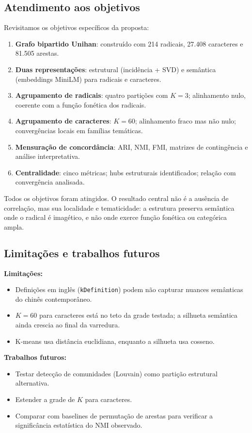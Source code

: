 \documentclass[10pt, a4paper, titlepage]{extarticle}
\begin{document}
\subsection{Atendimento aos objetivos}
Revisitamos os objetivos específicos da proposta:

\begin{enumerate}
    \item \textbf{Grafo bipartido Unihan}: construído com 214 radicais, 27.408 caracteres e 81.505 arestas.
    \item \textbf{Duas representações}: estrutural (incidência + SVD) e semântica (embeddings MiniLM) para radicais e caracteres.
    \item \textbf{Agrupamento de radicais}: quatro partições com $K = 3$; alinhamento nulo, coerente com a função fonética dos radicais.
    \item \textbf{Agrupamento de caracteres}: $K = 60$; alinhamento fraco mas não nulo; convergências locais em famílias temáticas.
    \item \textbf{Mensuração de concordância}: ARI, NMI, FMI,
    matrizes de contingência e análise interpretativa.
    \item \textbf{Centralidade}: cinco métricas; hubs estruturais identificados; relação com convergência analisada.
\end{enumerate}

Todos os objetivos foram atingidos. O resultado central não é a ausência de correlação, mas sua localidade e tematicidade: a estrutura preserva semântica onde o radical é imagético, e não onde exerce função fonética ou categórica ampla.

\subsection{Limitações e trabalhos futuros}
\textbf{Limitações:}
\begin{itemize}
    \item Definições em inglês (\texttt{kDefinition}) podem não capturar nuances semânticas do chinês contemporâneo.
    \item $K = 60$ para caracteres está no teto da grade testada; a silhueta semântica ainda crescia ao final da varredura.
    \item K-means usa distância euclidiana, enquanto a silhueta usa cosseno.
\end{itemize}

\textbf{Trabalhos futuros:}
\begin{itemize}
    \item Testar detecção de comunidades (Louvain) como partição estrutural alternativa.
    \item Estender a grade de $K$ para caracteres.
    \item Comparar com baselines de permutação de arestas para verificar a significância estatística do NMI observado.
\end{itemize}
\end{document}
